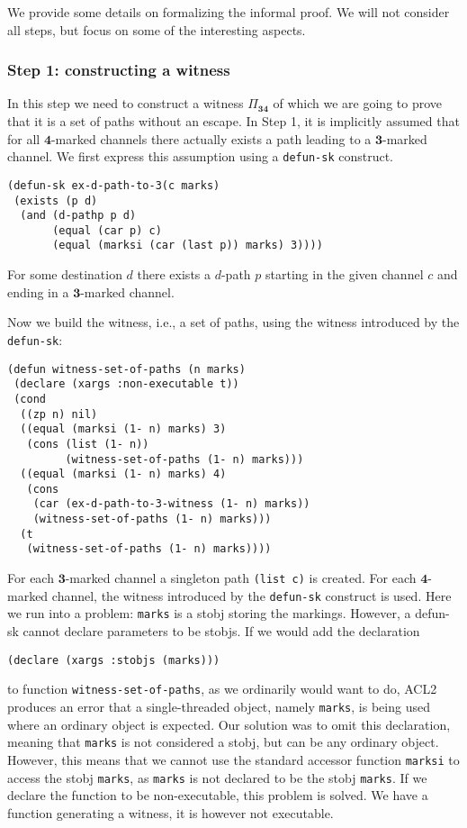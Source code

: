 \documentclass[submission,copyright]{eptcs}
\begin{document}
We provide some details on formalizing the informal proof. We will not consider all steps, but focus on some of the interesting aspects.

\subsubsection{Step 1: constructing a witness}
In this step we need to construct a witness $\Pi_\mathbf{34}$ of which we are going to prove that it is a set of paths without an escape. In Step 1, it is implicitly assumed that for all $\mathbf{4}$-marked channels
 there actually exists a path leading to a $\mathbf{3}$-marked channel. We first express this assumption using a {\tt defun-sk} construct.
\begin{verbatim}
(defun-sk ex-d-path-to-3(c marks)
 (exists (p d)
  (and (d-pathp p d)
       (equal (car p) c)
       (equal (marksi (car (last p)) marks) 3))))
\end{verbatim}
For some destination $d$ there exists a $d$-path $p$ starting in the given channel $c$ and ending in a $\mathbf{3}$-marked channel. 

Now we build the witness, i.e., a set of paths, using the witness introduced by the {\tt defun-sk}:
\begin{verbatim}
(defun witness-set-of-paths (n marks)
 (declare (xargs :non-executable t))
 (cond
  ((zp n) nil)
  ((equal (marksi (1- n) marks) 3)
   (cons (list (1- n))
         (witness-set-of-paths (1- n) marks)))
  ((equal (marksi (1- n) marks) 4)
   (cons
    (car (ex-d-path-to-3-witness (1- n) marks))
    (witness-set-of-paths (1- n) marks)))
  (t
   (witness-set-of-paths (1- n) marks))))
\end{verbatim}
For each $\mathbf{3}$-marked channel a singleton path {\tt (list c)} is created. For each $\mathbf{4}$-marked channel, the witness introduced by the {\tt defun-sk} construct is used.
Here we run into a problem: {\tt marks} is a stobj storing the markings. However, a defun-sk cannot declare parameters to be stobjs. If we would add the declaration
\begin{verbatim}
(declare (xargs :stobjs (marks)))
\end{verbatim}
to function {\tt witness-set-of-paths}, as we ordinarily would want to do, ACL2 produces an error that a single-threaded object, namely {\tt marks}, is being used where an ordinary object is expected.
 Our solution was to omit this declaration, meaning that {\tt marks} is not considered a stobj, but can be any ordinary object. However, this means that we cannot use the standard accessor function {\tt marksi} to access the stobj {\tt marks}, as {\tt marks} is not declared to be the stobj {\tt marks}. If we declare the function to be non-executable, this problem is solved. We have a function generating a witness, it is however not executable.
\end{document}
